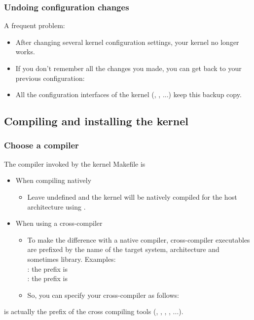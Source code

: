 \begin{frame}
  \frametitle{Undoing configuration changes}
  A frequent problem:
  \begin{itemize}
  \item After changing several kernel configuration settings, your
    kernel no longer works.
  \item If you don't remember all the changes you made,
    you can get back to your previous configuration:\\
  \item All the configuration interfaces of the kernel
    (, , ...) keep
    this  backup copy.
  \end{itemize}
\end{frame}

\subsection{Compiling and installing the kernel}

\begin{frame}
  \frametitle{Choose a compiler}
  The compiler invoked by the kernel Makefile is 
  \begin{itemize}
    \item When compiling natively
      \begin{itemize}
	 \item Leave  undefined and the kernel
	    will be natively compiled for the host architecture
            using .
      \end{itemize}
    \item When using a cross-compiler
      \begin{itemize}
      \item To make the difference with a native compiler, cross-compiler
          executables are prefixed by the name of the target system,
          architecture and sometimes library. Examples:\\
          \small
          : the prefix is \\
          : the prefix is 
      \item So, you can specify your cross-compiler as follows:\\
      \end{itemize} 
  \end{itemize}
   is actually the prefix of the cross compiling
tools (, , , , ...).
\end{frame}

